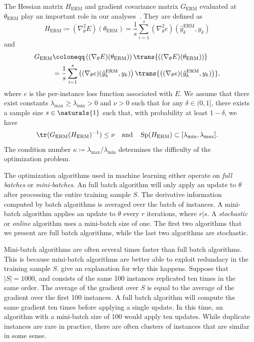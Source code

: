 \documentclass[11pt,a4paper]{article}
\numberwithin{equation}{section}
\begin{document}
The Hessian matrix $H_{\text{ERM}}$ and gradient covariance matrix
$G_{\text{ERM}}$ evaluated at $\theta_{\text{ERM}}$ play an important role in
our analyses~\citep{bousquet2008tradeoffs}. They are defined as
\[
	H_{\text{ERM}} \coloneqq (\nabla_\theta^2 E)(\theta_{\text{ERM}})
	= \frac{1}{s} \sum_{i = 1}^s (\nabla_\theta^2 e)(\hat{y}_k^{\text{ERM}}, y_k)
\]
and
\begin{align*}
	G_{\text{ERM}}
	&\coloneqq \left((\nabla_\theta E)(\theta_{\text{ERM}})\right)
		\trans{\left((\nabla_\theta E)(\theta_{\text{ERM}})\right)} \\
	&= \frac{1}{s} \sum_{i = 1}^s
		\left((\nabla_\theta e)(\hat{y}_k^{\text{ERM}}, y_k)\right)
		\trans{\left((\nabla_\theta e)(\hat{y}_k^{\text{ERM}}, y_k)\right)},
\end{align*}
where $e$ is the per-instance loss function associated with $E$. We assume that
there exist constants $\lambda_{\text{max}} \geq \lambda_{\text{min}} > 0$ and
$\nu > 0$ such that for any $\delta \in (0, 1]$, there exists a sample size $s
\in \naturals{1}$ such that, with probability at least $1 - \delta$, we have
\[
	\tr(G_{\text{ERM}} (H_{\text{ERM}})^{-1}) \leq \nu \quad\text{and}\quad
	\operatorname{Sp}(H_{\text{ERM}}) \subset [\lambda_{\text{min}}, \lambda_{\text{max}}].
\]
The condition number $\kappa \coloneqq
\lambda_{\text{max}}/{\lambda_{\text{min}}}$ determines the difficulty of the
optimization problem.

The optimization algorithms used in machine learning either operate on
\emph{full batches} or \emph{mini-batches}. An full batch algorithm will only
apply an update to $\theta$ after processing the entire training sample $S$. The
derivative information computed by batch algorithms is averaged over the batch
of instances. A mini-batch algorithm applies an update to $\theta$ every $r$
iterations, where $r | s$. A \emph{stochastic} or \emph{online} algorithm uses a
mini-batch size of one. The first two algorithms that we present are full batch
algorithms, while the last two algorithms are stochastic.

Mini-batch algorithms are often several times faster than full batch algorithms.
This is because mini-batch algorithms are better able to exploit redundacy in
the training sample $S$. \citet{lecun-98b} give an explanation for why this
happens. Suppose that $|S| = 1000$, and consists of the same 100 instances
replicated ten times in the same order. The average of the gradient over $S$ is
equal to the average of the gradient over the first 100 instances. A full batch
algorithm will compute the same gradient ten times before applying a single
update. In this time, an algorithm with a mini-batch size of 100 would apply ten
updates. While duplicate instances are rare in practice, there are often
clusters of instances that are similar in some sense.
\end{document}
